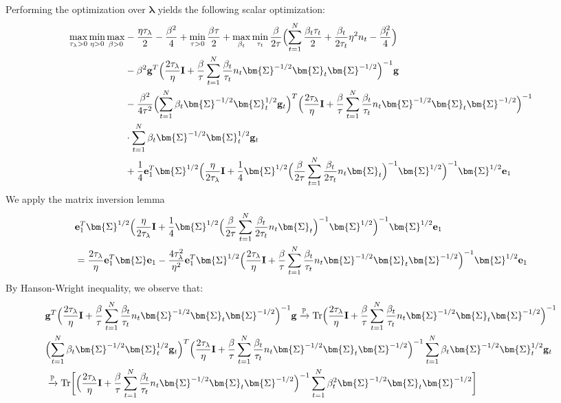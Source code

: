 \documentclass[final]{l4dc2026}
\newcommand{\bSigma}{\bm{\Sigma}}
\newcommand{\blambda}{\bm{\lambda}}
\newcommand{\bI}{\mathbf{I}}
\newcommand{\be}{\mathbf{e}}
\newcommand{\bg}{\mathbf{g}}
\newcommand{\bbP}{\mathbb{P}}
\newcommand{\tr}{\text{Tr}}
\newcommand{\rarrowp}{\xrightarrow[]{\bbP}}
\begin{document}
Performing the optimization over $\blambda$ yields the following scalar optimization:
\begin{align*}
    \max_{\tau_{\lambda}>0} \min_{\eta > 0} \max_{\beta>0} & -\frac{\eta \tau_{\lambda}}{2} - \frac{\beta^2}{4} + \min_{ \tau>0} \frac{\beta \tau}{2}+\max_{\beta_t} \min_{\tau_t} \frac{\beta}{2\tau} \Bigl( \sum_{t=1}^N \frac{\beta_t \tau_t}{2} + \frac{\beta_t}{2\tau_t} \eta^2 n_t - \frac{\beta_t^2}{4}\Bigr)\\
     &-\beta^2\bg^T \Bigl(\frac{2\tau_{\lambda}}{\eta}\bI+\frac{\beta}{\tau}\sum_{t=1}^N \frac{\beta_t}{\tau_t} n_t \bSigma^{-1/2}\bSigma_t \bSigma^{-1/2} \Bigr)^{-1} \bg\\ 
      &-\frac{\beta^2}{4\tau^2} \Bigl(\sum_{t=1}^N \beta_t \bSigma^{-1/2} \bSigma_t^{1/2}\bg_t\Bigr)^T\Bigl(\frac{2\tau_{\lambda}}{\eta}\bI+\frac{\beta}{\tau}\sum_{t=1}^N \frac{\beta_t}{\tau_t} n_t \bSigma^{-1/2}\bSigma_t \bSigma^{-1/2} \Bigr)^{-1} \\
      &\cdot \sum_{t=1}^N \beta_t \bSigma^{-1/2} \bSigma_t^{1/2}\bg_t\\ 
     &+\frac{1}{4}\be_1^T\bSigma^{1/2}\Bigl(\frac{\eta}{2\tau_{\lambda}}\bI+\frac{1}{4}\bSigma^{1/2} \Bigl(\frac{\beta}{2\tau}\sum_{t=1}^N \frac{\beta_t}{2\tau_t} n_t \bSigma_t \Bigr)^{-1}\bSigma^{1/2}\Bigr)^{-1}\bSigma^{1/2} \be_1
\end{align*}
We apply the matrix inversion lemma
\begin{align*}
    &\be_1^T\bSigma^{1/2}\Bigl(\frac{\eta}{2\tau_{\lambda}}\bI+\frac{1}{4}\bSigma^{1/2} \Bigl(\frac{\beta}{2\tau}\sum_{t=1}^N \frac{\beta_t}{2\tau_t} n_t \bSigma_t \Bigr)^{-1}\bSigma^{1/2}\Bigr)^{-1}\bSigma^{1/2} \be_1\\
    &= \frac{2\tau_{\lambda}}{\eta} \be_1^T \bSigma \be_1
    - \frac{4 \tau^2_{\lambda}}{\eta^2} \be_1^T \bSigma^{1/2} \Bigl(\frac{2\tau_{\lambda}}{\eta}\bI+\frac{\beta}{\tau}\sum_{t=1}^N \frac{\beta_t}{\tau_t} n_t \bSigma^{-1/2}\bSigma_t \bSigma^{-1/2} \Bigr)^{-1} \bSigma^{1/2} \be_1
\end{align*}
By Hanson-Wright inequality, we observe that:
\begin{align*}
    &\bg^T \Bigl(\frac{2\tau_{\lambda}}{\eta}\bI+\frac{\beta}{\tau}\sum_{t=1}^N \frac{\beta_t}{\tau_t} n_t \bSigma^{-1/2}\bSigma_t \bSigma^{-1/2} \Bigr)^{-1} \bg 
    \rarrowp \tr \Bigl(\frac{2\tau_{\lambda}}{\eta}\bI+\frac{\beta}{\tau}\sum_{t=1}^N \frac{\beta_t}{\tau_t} n_t \bSigma^{-1/2}\bSigma_t \bSigma^{-1/2} \Bigr)^{-1} \\
    &\Bigl(\sum_{t=1}^N \beta_t \bSigma^{-1/2} \bSigma_t^{1/2}\bg_t\Bigr)^T\Bigl(\frac{2\tau_{\lambda}}{\eta}\bI+\frac{\beta}{\tau}\sum_{t=1}^N \frac{\beta_t}{\tau_t} n_t \bSigma^{-1/2}\bSigma_t \bSigma^{-1/2} \Bigr)^{-1}\sum_{t=1}^N \beta_t \bSigma^{-1/2} \bSigma_t^{1/2}\bg_t \\
    &\rarrowp  \tr  \biggl[\Bigl(\frac{2\tau_{\lambda}}{\eta}\bI+\frac{\beta}{\tau}\sum_{t=1}^N \frac{\beta_t}{\tau_t} n_t \bSigma^{-1/2}\bSigma_t \bSigma^{-1/2} \Bigr)^{-1} \sum_{t=1}^N \beta^2_t \bSigma^{-1/2}  \bSigma_t \bSigma^{-1/2}\biggr]
\end{align*}
\end{document}
